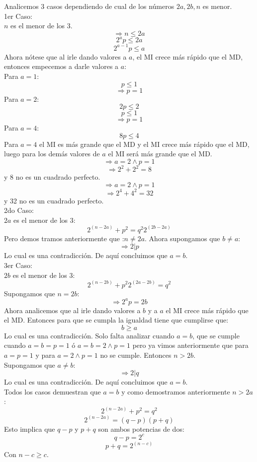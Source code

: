 \documentclass{book}
\begin{document}
\begin{enumerate}
        Analicemos 3 casos dependiendo de cual de los números $2a, 2b,n$ es menor.\\
        1er Caso:\\
        $n$ es el menor de los 3.
        $$\Rightarrow n\leq 2a$$
        $$2^ap\leq 2a$$
        $$2^{a-1}p\leq a$$
        Ahora nótese que al irle dando valores a $a$, el MI crece más rápido que el MD, entonces empecemos a darle valores a $a$:\\
        Para $a=1$:
        $$p\leq 1$$
        $$\Rightarrow p=1$$
        Para $a=2$:
        $$2p\leq 2$$
        $$p\leq 1$$
        $$\Rightarrow p=1$$
        Para $a=4$:
        $$8p\leq 4$$
        Para $a=4$ el MI es más grande que el MD y el MI crece más rápido que el MD, luego para los demás valores de $a$ el MI será más grande que el MD.
        $$\Rightarrow a=2\wedge p=1$$
        $$\Rightarrow 2^2+2^2=8$$
        y 8 no es un cuadrado perfecto.\\
        $$\Rightarrow a=2\wedge p=1$$
        $$\Rightarrow 2^4+4^2=32$$
        y 32 no es un cuadrado perfecto.\\
        2do Caso:\\
        $2a$ es el menor de los 3:
        $$2^{(n-2a)}+p^2=q^2 2^{(2b-2a)}$$
        Pero demos tramos anteriormente que :$n\neq 2a$. Ahora supongamos que $b\neq a$:
        $$\Rightarrow 2|p$$
        Lo cual es una contradicción. De aquí concluimos que $a=b$.\\
        3er Caso:\\
        $2b$ es el menor de los 3:
        $$2^{(n-2b)}+p^2 2^{(2a-2b)}=q^2$$
        Supongamos que $n=2b$:
        $$\Rightarrow 2^ap=2b$$
        Ahora analicemos que al irle dando valores a $b$ y a $a$  el MI crece más rápido que el MD. Entonces para que se cumpla la igualdad tiene que cumplirse que:
        $$b\geq a$$
        Lo cual es una contradicción. Solo falta analizar cuando $a=b$, que se cumple cuando $a=b=p=1$ ó $a=b=2\wedge p=1$ pero ya vimos anteriormente que para $a=p=1$ y para $a=2\wedge p=1$ no se cumple. Entonces $n>2b$. \\
        Supongamos que $a\neq b$:
        $$\Rightarrow 2|q$$
        Lo cual es una contradicción. De aquí concluimos que $a=b$.\\
        Todos los casos demuestran que $a=b$ y como demostramos anteriormente $n>2a$:
        $$2^{(n-2a)}+p^2=q^2$$
        $$2^{(n-2a)}=(q-p)(p+q)$$
        Esto implica que $q-p$ y $p+q$ son ambos potencias de dos:
        $$q-p=2^c$$
        $$p+q=2^{(n-c)}$$
        Con $n-c\geq c$.

\end{enumerate}
\end{document}

